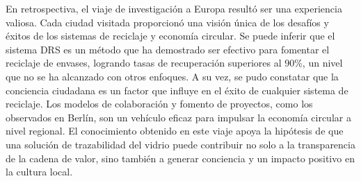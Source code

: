 En retrospectiva, el viaje de investigación a Europa resultó ser una experiencia valiosa. Cada ciudad visitada proporcionó una visión única de los desafíos y éxitos de los sistemas de reciclaje y economía circular. Se puede inferir que el sistema DRS es un método que ha demostrado ser efectivo para fomentar el reciclaje de envases, logrando tasas de recuperación superiores al 90\%, un nivel que no se ha alcanzado con otros enfoques. A su vez, se pudo constatar que la conciencia ciudadana es un factor que influye en el éxito de cualquier sistema de reciclaje. Los modelos de colaboración y fomento de proyectos, como los observados en Berlín, son un vehículo eficaz para impulsar la economía circular a nivel regional. El conocimiento obtenido en este viaje apoya la hipótesis de que una solución de trazabilidad del vidrio puede contribuir no solo a la transparencia de la cadena de valor, sino también a generar conciencia y un impacto positivo en la cultura local.

